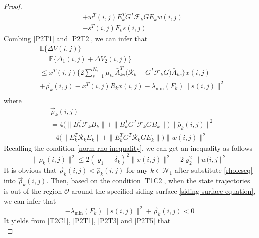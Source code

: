 \documentclass[conference]{IEEEtran}
\begin{document}
\begin{proof}
\begin{equation}
\begin{split}
			&+w^{T}(i,j)E^{T}_{k}G^{T}\mathcal{F}_{k}GE_{k}w(i,j)\\
			&-s^{T}(i,j)F_{k}s(i,j)
		\end{split}
	\end{equation}
	Combing \eqref{P2T1} and \eqref{P2T2}, we can infer that 
	\begin{equation}\label{P2T3}
		\begin{split}
				&\mathbb{E}\{\varDelta V(i,j) \}\\
				&= \mathbb{E}\Big\{\varDelta_{1}(i,j)+\varDelta V_{2}(i,j) \Big\}\\
				&\leq x^{T}(i,j)\Big\{ 2\sum_{s=1}^{N_{2}}\mu_{ks}\bar{A}^{T}_{ks}\big(\mathcal{R}_{k} +G^{T}\mathcal{F}_{k}G\big)\bar{A}_{ks} \Big\} x(i,j) \\
				& +\vec{\rho}_{k}(i,j)-x^{T}(i,j)R_{k}x(i,j) - \lambda_{\mathrm{min}}(F_{k})\|s(i,j)\|^{2}\\
		\end{split}
	\end{equation}
	where
	\begin{equation*}
		\begin{split}
			&\vec{\rho}_{k}(i,j)\\
			&= 4\big(\|B^{T}_{k}\mathcal{F}_{k}B_{k}\|+ \|B^{T}_{k}G^{T}\mathcal{F}_{k}GB_{k}\|\big) \|\bar{\rho}_{k}(i,j)\|^{2} \\
			&+ 4\big(\|E^{T}_{k}\mathcal{R}_{k}E_{k}\|+ \|E^{T}_{k}G^{T}\mathcal{R}_{k}GE_{k}\|\big) \|w(i,j)\|^{2} 
		\end{split}
	\end{equation*}
	Recalling the condition \eqref{norm-rho-inequality}, we can get an inequality as follows
	\begin{equation}\label{rholeseq}
		\|\bar{\rho}_{k}(i,j)\|^{2} \leq 2(\varrho_{1}+\delta_{k})^{2}\|x(i,j)\|^{2} +2\varrho_{2}^{2}\|w(i,j\|^{2} 
	\end{equation}	  
	It is obvious that $\vec{\rho}_{k}(i,j) < \hat{\rho}_{k}(i,j) $ for any $k\in\mathcal{N}_{1}$ after substitute \eqref{rholeseq} into $\vec{\rho}_{k}(i,j)$. 
	Then, based on the condition \eqref{T1C2}, when the state trajectories is out of the region $\mathcal{O}$ around the specified siding surface \eqref{siding-surface-equation}, we can infer that
	\begin{equation}\label{P2T5}
		-\lambda_{\mathrm{min}}(F_{k})\|s(i,j)\|^{2} + \vec{\rho}_{k}(i,j) <0
	\end{equation}
	It yields from \eqref{T2C1}, \eqref{P2T1}, \eqref{P2T3} and \eqref{P2T5} that 
	\begin{equation}

\end{equation}
\end{proof}
\end{document}
